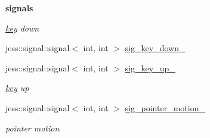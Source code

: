\begin{Indent}{\bf signals}\par
{\em \label{_amgrpa8420f8bebd6d9578b405b6bbaa813d9}
 \hyperlink{classnebula_1_1platform_1_1key}{key} down }\begin{DoxyCompactItemize}
\item 
jess::signal::signal$<$ int, int $>$ \hyperlink{classnebula_1_1platform_1_1window_1_1base_a7cc037a22541ebb0073ccb5a291d4bae}{sig\_\-key\_\-down\_\-}
\item 
jess::signal::signal$<$ int, int $>$ \hyperlink{classnebula_1_1platform_1_1window_1_1base_a7dc6d6abd5bd88a775e85fc48a1f69e7}{sig\_\-key\_\-up\_\-}
\begin{DoxyCompactList}\small\item\em \hyperlink{classnebula_1_1platform_1_1key}{key} up \item\end{DoxyCompactList}\item 
jess::signal::signal$<$ int, int $>$ \hyperlink{classnebula_1_1platform_1_1window_1_1base_a85ea0376b7d86fd764e308f51d5a758f}{sig\_\-pointer\_\-motion\_\-}
\begin{DoxyCompactList}\small\item\em pointer motion \item\end{DoxyCompactList}\end{DoxyCompactItemize}
\end{Indent}
